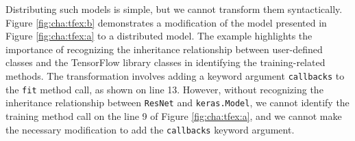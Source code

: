 
Distributing such models is simple, but we cannot transform them syntactically.
Figure \ref{fig:cha:tfex:b} demonstrates a modification of the model presented
in Figure \ref{fig:cha:tfex:a} to a distributed model. 
The example highlights the importance of recognizing the inheritance
relationship between user-defined classes and the TensorFlow library classes in
identifying the training-related methods. 
The transformation involves adding a keyword argument {\tt callbacks} to the
{\tt fit} method call, as shown on line 13.
However, without recognizing the inheritance relationship between {\tt ResNet}
and {\tt keras.Model}, we cannot identify the training method call on the line
9 of Figure \ref{fig:cha:tfex:a}, and we cannot make the necessary modification
to add the {\tt callbacks} keyword argument.


